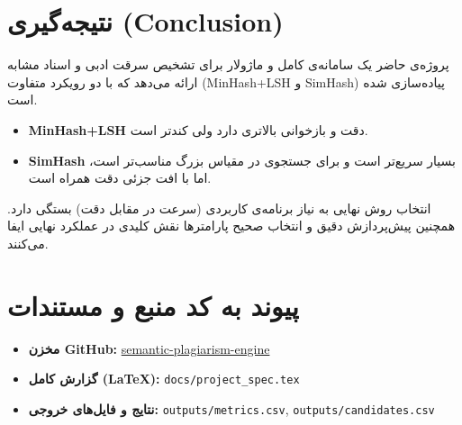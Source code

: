 \documentclass[12pt,a4paper]{article}
\begin{document}
\section{نتیجه‌گیری (Conclusion)}

پروژه‌ی حاضر یک سامانه‌ی کامل و ماژولار برای تشخیص سرقت ادبی و اسناد مشابه ارائه می‌دهد که با دو رویکرد متفاوت (MinHash+LSH و SimHash) پیاده‌سازی شده است.

\begin{itemize}
    \item \textbf{MinHash+LSH} دقت و بازخوانی بالاتری دارد ولی کندتر است.
    \item \textbf{SimHash} بسیار سریع‌تر است و برای جستجوی در مقیاس بزرگ مناسب‌تر است، اما با افت جزئی دقت همراه است.
\end{itemize}

انتخاب روش نهایی به نیاز برنامه‌ی کاربردی (سرعت در مقابل دقت) بستگی دارد. همچنین پیش‌پردازش دقیق و انتخاب صحیح پارامترها نقش کلیدی در عملکرد نهایی ایفا می‌کنند.

\section{پیوند به کد منبع و مستندات}

\begin{itemize}
    \item \textbf{مخزن GitHub:} \href{https://github.com/your-username/semantic-plagiarism-engine}{semantic-plagiarism-engine}
    \item \textbf{گزارش کامل (LaTeX):} \texttt{docs/project\_spec.tex}
    \item \textbf{نتایج و فایل‌های خروجی:} \texttt{outputs/metrics.csv}, \texttt{outputs/candidates.csv}
\end{itemize}
\end{document}
